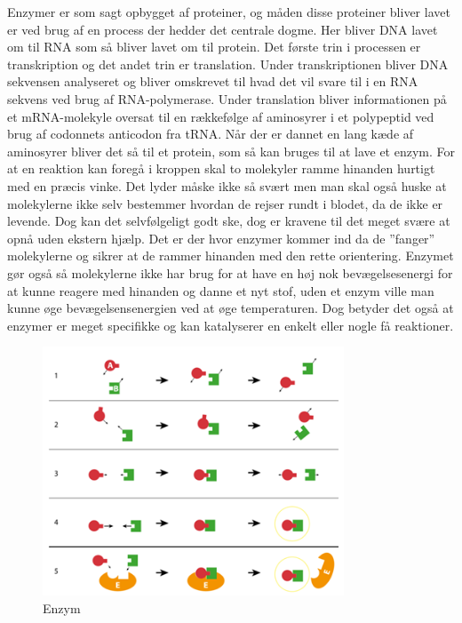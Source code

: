 Enzymer er som sagt opbygget af proteiner, og måden disse proteiner bliver lavet er ved brug af en process der hedder det centrale dogme. Her bliver DNA lavet om til RNA som så bliver lavet om til protein. Det første trin i processen er transkription og det andet trin er translation. Under transkriptionen bliver DNA sekvensen analyseret og bliver omskrevet til hvad det vil svare til i en RNA sekvens ved brug af RNA-polymerase. Under translation bliver informationen på et mRNA-molekyle oversat til en rækkefølge af aminosyrer i et polypeptid ved brug af codonnets anticodon fra tRNA. Når der er dannet en lang kæde af aminosyrer bliver det så til et protein, som så kan bruges til at lave et enzym.
For at en reaktion kan foregå i kroppen skal to molekyler ramme hinanden hurtigt med en præcis vinke. Det lyder måske ikke så svært men man skal også huske at molekylerne ikke selv bestemmer hvordan de rejser rundt i blodet, da de ikke er levende. Dog kan det selvfølgeligt godt ske, dog er kravene til det meget svære at opnå uden ekstern hjælp. Det er der hvor enzymer kommer ind da de ”fanger” molekylerne og sikrer at de rammer hinanden med den rette orientering. Enzymet gør også så molekylerne ikke har brug for at have en høj nok bevægelsesenergi for at kunne reagere med hinanden og danne et nyt stof, uden et enzym ville man kunne øge bevægelsensenergien ved at øge temperaturen. Dog betyder det også at enzymer er meget specifikke og kan katalyserer en enkelt eller nogle få reaktioner. 
\begin{figure}
    \centering
    \includegraphics[width=0.8\textwidth]{figurs/enzym1.png}
    \caption{Enzym}
    \label{fig:enzym2}
\end{figure}
